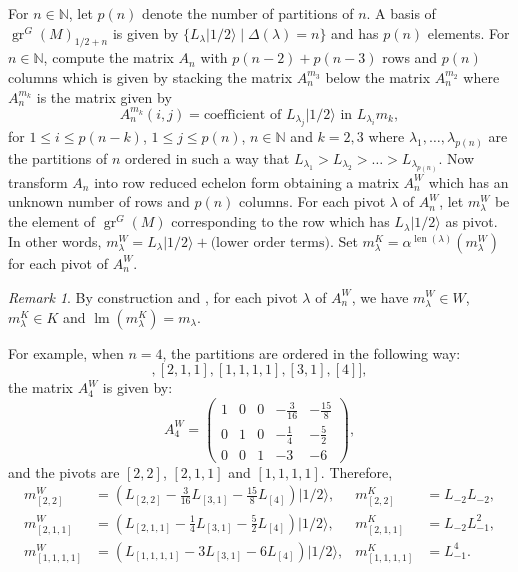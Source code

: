 \documentclass[12pt, a4paper]{article}
\theoremstyle{remark}
\newtheorem{remark}[theorem]{Remark}
\DeclareMathOperator{\gr}{gr}
\DeclareMathOperator{\lm}{lm}
\DeclareMathOperator{\len}{len}
\newcommand{\vachalf}{|1/2\rangle}
\begin{document}
For $n \in \mathbb{N}$, let $p(n)$ denote the number of partitions of $n$.
A basis of $\gr^G(M)_{1/2 + n}$ is given by $\{L_\lambda\vachalf \mid \Delta(\lambda) = n\}$ and has $p(n)$ elements. 
For $n\in \mathbb{N}$, compute the matrix $A_n$ with $p(n - 2) + p(n - 3)$ rows and $p(n)$ columns which is given by stacking the matrix $A^{m_3}_n$ below the matrix $A^{m_2}_n$ where $A^{m_k}_n$ is the matrix given by
\begin{equation*}
  A^{m_k}_n(i, j) = \text{coefficient of }L_{\lambda_j}\vachalf\text{ in }L_{\lambda_i}m_k,
\end{equation*}
for $1 \le i \le p(n - k)$, $1 \le j \le p(n)$, $n \in \mathbb{N}$ and $k = 2, 3$ where $\lambda_1, \dots, \lambda_{p(n)}$ are the partitions of $n$ ordered in such a way that $L_{\lambda_1} > L_{\lambda_2} > \dots > L_{\lambda_{p(n)}}$.
Now transform $A_n$ into row reduced echelon form obtaining a matrix $A^W_n$ which has an unknown number of rows and $p(n)$ columns.
For each pivot $\lambda$ of $A^W_n$, let $m^W_\lambda$ be the element of $\gr^G(M)$ corresponding to the row which has $L_\lambda\vachalf$ as pivot.
In other words, $m^W_\lambda = L_\lambda\vachalf + \text{(lower order terms)}$.
Set $m^K_\lambda = \alpha^{\len(\lambda)}(m^W_\lambda)$ for each pivot of $A^W_n$.

\begin{remark}
  \label{rmk:2}
  By construction and , for each pivot $\lambda$ of $A^W_n$, we have $m^W_\lambda\in W$, $m^K_\lambda \in K$ and $\lm(m^K_\lambda) = m_\lambda$.
\end{remark}

For example, when $n = 4$, the partitions are ordered in the following way:
  \begin{equation*}
    [[2, 2], [2, 1, 1], [1, 1, 1, 1], [3, 1], [4]],
  \end{equation*}
  the matrix $A^W_4$ is given by:
  \begin{equation*}
    A^W_4=
    \begin{pmatrix}
      1 & 0 & 0 & -\frac{3}{16} & -\frac{15}{8} \\
      0 & 1 & 0 & -\frac{1}{4} & -\frac{5}{2} \\
      0 & 0 & 1 & -3 & -6
    \end{pmatrix},
  \end{equation*}
  and the pivots are $[2, 2]$, $[2, 1, 1]$ and $[1, 1, 1, 1]$.
  Therefore,
  \begin{align*}
    m^W_{[2, 2]} &= (L_{[2, 2]} - \tfrac{3}{16}L_{[3, 1]} - \tfrac{15}{8}L_{[4]})\vachalf, &m^K_{[2, 2]} &= L_{-2}L_{-2}, \\
    m^W_{[2, 1, 1]} &= (L_{[2, 1, 1]} - \tfrac{1}{4}L_{[3, 1]} - \tfrac{5}{2}L_{[4]})\vachalf, &m^K_{[2, 1, 1]} &= L_{-2}L_{-1}^2, \\
    m^W_{[1, 1, 1, 1]} &= (L_{[1, 1, 1, 1]} - 3L_{[3, 1]} - 6L_{[4]})\vachalf, &m^K_{[1, 1, 1, 1]} &= L_{-1}^4.
  \end{align*}
  
\end{document}
